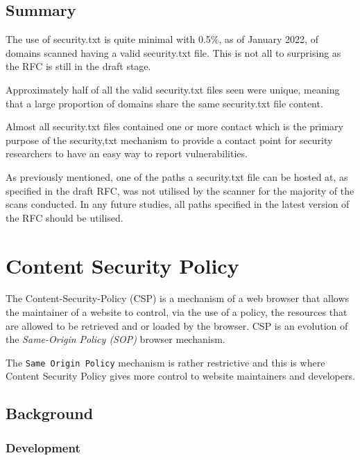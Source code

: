 \documentclass{mscreport}
\begin{document}
\subsection{Summary}

\noindent
The use of security.txt is quite minimal with 0.5\%, as of January 2022, of domains scanned having a valid security.txt file. This is not all to surprising as the RFC is still in the draft stage.

\vspace{0.3cm} \noindent
Approximately half  of all the valid security.txt files seen were unique, meaning that a large proportion of domains share the same security.txt file content.

\vspace{0.3cm} \noindent
Almost all security.txt files contained one or more contact which is the primary purpose of the security,txt mechanism to provide a contact point for security researchers to have an easy way to report  vulnerabilities.

\vspace{0.3cm} \noindent
As previously mentioned, one of the paths a security.txt file can be hosted at, as specified in the draft RFC, was not utilised by the scanner for the majority of the scans conducted. In any future studies, all paths specified in the latest version of the RFC should be utilised.


\newpage

\section{Content Security Policy}
\label{section:csp}

The Content-Security-Policy (CSP) is a mechanism of a web browser that allows the maintainer of a website to control, via the use of a policy, the resources that are allowed to be retrieved and or loaded by the browser. CSP is an evolution of the \textit{Same-Origin Policy (SOP)} browser mechanism.

\vspace{0.3cm} \noindent
The \texttt{Same Origin Policy} mechanism is rather restrictive and this is where Content Security Policy gives more control to website maintainers and developers.

\subsection{Background}
\subsubsection{Development}
\end{document}

